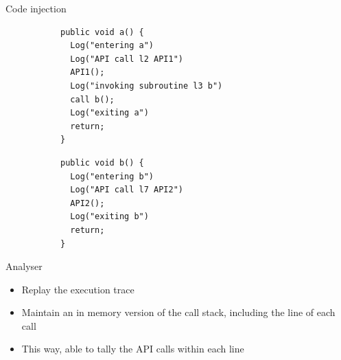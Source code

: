 \begin{frame}[fragile]{Code injection}
\begin{figure}
\caption{Injected functions}
\centering
\begin{subfigure}[t]{0.49\textwidth}
\centering
\begin{lstlisting}
public void a() {
  Log("entering a")
  Log("API call l2 API1")
  API1();
  Log("invoking subroutine l3 b")
  call b();
  Log("exiting a")
  return;
}
\end{lstlisting}
\end{subfigure}
%
\begin{subfigure}[t]{0.49\textwidth}
\centering
\begin{lstlisting}
public void b() {
  Log("entering b")
  Log("API call l7 API2")
  API2();
  Log("exiting b")
  return;
}
\end{lstlisting}
\end{subfigure}
\end{figure}
\end{frame} 
%
%
\begin{frame}[fragile]{Analyser} %
\begin{itemize}
\item Replay the execution trace
\item Maintain an in memory version of the call stack, including the line of each call
\item This way, able to tally the API calls within each line
\end{itemize}

\note{
}
\end{frame}  
